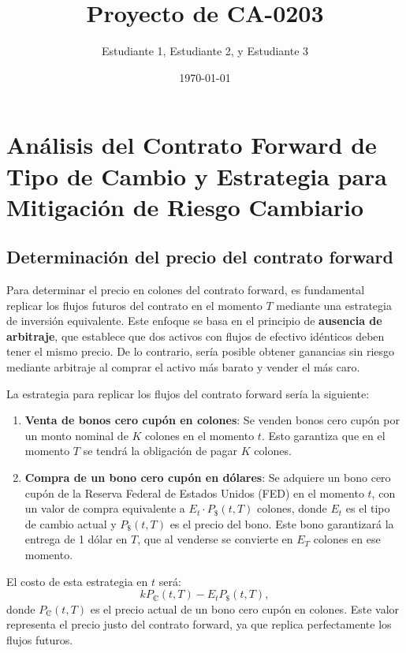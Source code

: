 \documentclass[12pt]{article}
\author{Estudiante 1, Estudiante 2, y Estudiante 3}
\date{\today}
\title{Proyecto de CA-0203}
\begin{document}
\maketitle

\newpage
\tableofcontents

\newpage

\section{Análisis del Contrato Forward de Tipo de Cambio y Estrategia para Mitigación de Riesgo Cambiario}

\subsection*{Determinación del precio del contrato forward}

Para determinar el precio en colones del contrato forward, es fundamental replicar los flujos futuros del contrato en el momento \( T \) mediante una estrategia de inversión equivalente. Este enfoque se basa en el principio de \textbf{ausencia de arbitraje}, que establece que dos activos con flujos de efectivo idénticos deben tener el mismo precio. De lo contrario, sería posible obtener ganancias sin riesgo mediante arbitraje al comprar el activo más barato y vender el más caro.

La estrategia para replicar los flujos del contrato forward sería la siguiente:

\begin{enumerate}
    \item \textbf{Venta de bonos cero cupón en colones}: Se venden bonos cero cupón por un monto nominal de \( K \) colones en el momento \( t \). Esto garantiza que en el momento \( T \) se tendrá la obligación de pagar \( K \) colones.
    \item \textbf{Compra de un bono cero cupón en dólares}: Se adquiere un bono cero cupón de la Reserva Federal de Estados Unidos (FED) en el momento \( t \), con un valor de compra equivalente a \( E_t \cdot P_{\text{\$}}(t, T) \) colones, donde \( E_t \) es el tipo de cambio actual y \( P_{\text{\$}}(t, T) \) es el precio del bono. Este bono garantizará la entrega de 1 dólar en \( T \), que al venderse se convierte en \( E_T \) colones en ese momento.
\end{enumerate}

El costo de esta estrategia en \( t \) será:
\[
kP_{\text{₡}}(t, T) - E_t P_{\text{\$}}(t, T),
\]
donde \( P_{\text{₡}}(t, T) \) es el precio actual de un bono cero cupón en colones. Este valor representa el precio justo del contrato forward, ya que replica perfectamente los flujos futuros.
\end{document}
